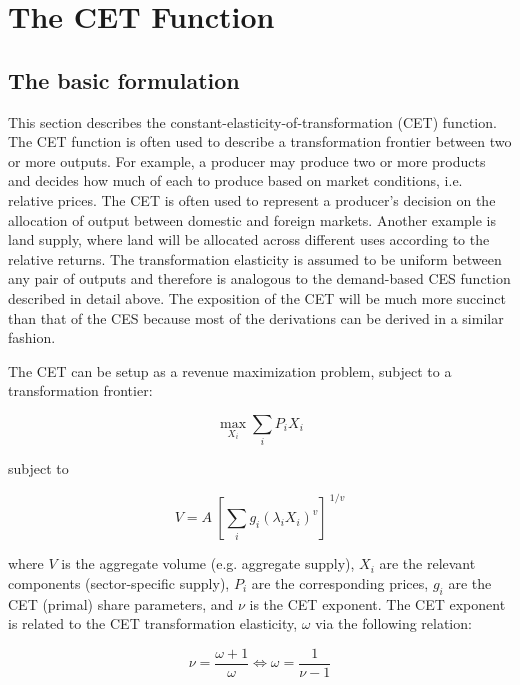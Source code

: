 \section{The CET Function}

\subsection{The basic formulation}

This section describes the constant-elasticity-of-transformation (CET) function. The CET function is
often used to describe a transformation frontier between two or more outputs. For example, a
producer may produce two or more products and decides how much of each to produce based on
market conditions, i.e. relative prices. The CET is often used to represent a producer's decision on
the allocation of output between domestic and foreign markets. Another example is land supply,
where land will be allocated across different uses according to the relative returns. The
transformation elasticity is assumed to be uniform between any pair of outputs and therefore is
analogous to the demand-based CES function described in detail above.
The exposition of the CET will be much more succinct than that of the CES because most
of the derivations can be derived in a similar fashion.

The CET can be setup as a  revenue maximization problem, subject to a transformation frontier:

\begin{displaymath}
\max_{X_i} \sum\limits_{i}{{{P}_{i}}{{X}_{i}}}
\end{displaymath}

\noindent subject to

\begin{displaymath}
V=A\ {{\left[ \sum\limits_{i}{{{g}_{i}}{{\left( {{\lambda }_{i}}{{X}_{i}}
\right)}^{v}}} \right]}^{\ 1/v}}
\end{displaymath}

\noindent where $V$ is the aggregate volume (e.g. aggregate supply), $X_i$ are the relevant
components (sector-specific supply), $P_i$ are the corresponding prices, $g_i$ are the CET
(primal) share parameters, and $\nu$ is the CET exponent. The CET exponent is related to the
CET transformation elasticity, $\omega$ via the following relation:

\begin{displaymath}
\nu =\frac{\omega +1}{\omega }\Leftrightarrow \omega =\frac{1}{\nu -1}
\end{displaymath}


